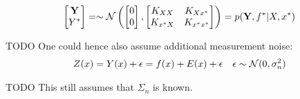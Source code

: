 \begin{gather}
    \begin{bmatrix}
        \mathbf{Y} \\
        Y^{\ast}
    \end{bmatrix} =
    \sim \operatorname{\mathcal{N}} \left(
        \begin{bmatrix}
        0 \\
        0
        \end{bmatrix},
        \begin{bmatrix}
        K_{XX} & K_{Xx^{\ast}} \\
        K_{x^{\ast}X} & K_{x^{\ast}x^{\ast}}
        \end{bmatrix}
        \right)
    = p(\mathbf{Y}, f^{\ast}| X, x^{\ast})
\end{gather}





TODO
One could hence also assume additional measurement noise:
\begin{align*}
    Z(x) = Y(x) + \epsilon = f(x) + E(x) + \epsilon  && \epsilon \sim \operatorname{\mathcal{N}}(0, \sigma_n^{2})
\end{align*}




TODO
This still  assumes that $\Sigma_n$ is known.




